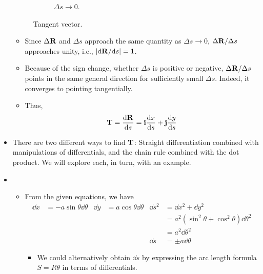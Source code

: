\documentclass[../main.tex]{subfiles}
\begin{document}
\begin{itemize}
\begin{figure}[h!]
\begin{subfigure}[b]{0.33\linewidth}
            \caption{$\Delta s\to 0$.}
            \label{fig:tangentVectorc}
        \end{subfigure}
        \caption{Tangent vector.}
        \label{fig:tangentVector}
    \end{figure}
    \begin{itemize}
        \item Since $\Delta\vb{R}$ and $\Delta s$ approach the same quantity as $\Delta s\to 0$, $\Delta\vb{R}/\Delta s$ approaches unity, i.e., $|\text{d}\vb{R}/\text{d}s|=1$.
        \item Because of the sign change, whether $\Delta s$ is positive or negative, $\Delta\vb{R}/\Delta s$ points in the same general direction for sufficiently small $\Delta s$. Indeed, it converges to pointing tangentially.
        \item Thus,
        \begin{equation*}
            \vb{T} = \dv{\vb{R}}{s} = \vb{i}\dv{x}{s}+\vb{j}\dv{y}{s}
        \end{equation*}
    \end{itemize}
    \item There are two different ways to find $\vb{T}$: Straight differentiation combined with manipulations of differentials, and the chain rule combined with the dot product. We will explore each, in turn, with an example.
    \item {}
    \begin{itemize}
        \item From the given equations, we have
        \begin{align*}
            \dd{x} &= -a\sin\theta\dd{\theta}&
                \dd{y} &= a\cos\theta\dd{\theta}&
                    \dd{s}^2 &= \dd{x}^2+\dd{y}^2\\
            &&
                &&
                    &= a^2(\sin^2\theta+\cos^2\theta)\dd{\theta}^2\\
            &&
                &&
                    &= a^2\dd{\theta}^2\\
            &&
                &&
                    \dd{s} &= \pm a\dd{\theta}
        \end{align*}
        \begin{itemize}
            \item We could alternatively obtain $\dd{s}$ by expressing the arc length formula $S=R\theta$ in terms of differentials.

\end{itemize}
\end{itemize}
\end{itemize}
\end{document}

